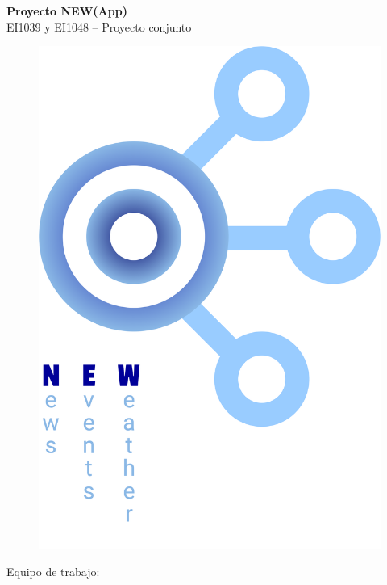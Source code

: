 \documentclass[11pt]{article}
\begin{document}
\sloppy

	\begin{center}
		{\LARGE \textbf{Proyecto NEW(App)}}\\
		\vspace{5mm}
		EI1039 y EI1048 -- Proyecto conjunto\\

		\vspace{15mm}

		\begin{figure}[H]
			\begin{center}
			\includegraphics[scale=0.097]{images/LogoInicio.png}
			\end{center}
		\end{figure}

		\vspace{-5mm}
		Equipo de trabajo:
	\end{center}
	
\end{document}

